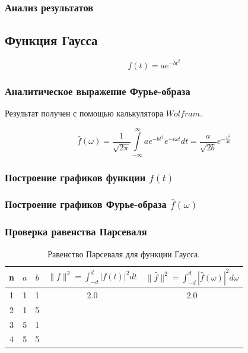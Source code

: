 \documentclass[a5paper, 10pt]{article}
\theoremstyle{definition}
\theoremstyle{plain}
\theoremstyle{remark}
\begin{document}
\subsubsection{Анализ результатов}





\newpage
\subsection{Функция Гаусса}

\begin{equation}
f(t) = a e^{-bt^2}
\end{equation}


\subsubsection{Аналитическое выражение Фурье-образа}

Результат получен с помощью калькулятора $Wolfram$.

\begin{equation}
\hat{f}(\omega) =
 \frac{1}{\sqrt{2 \pi}} \int \limits_{-\infty}^{\infty}  a e^{-bt^2} e^{-i \omega t} dt = \frac{a}{\sqrt{2b}} e^{-\frac{\omega^2}{4b}}
\end{equation}

\subsubsection{Построение графиков функции $f(t)$}





\subsubsection{Построение графиков Фурье-образа $\hat{f} (\omega)$}




\subsubsection{Проверка равенства Парсеваля}

\begin{table}[h!]
\caption{Равенство Парсеваля для функции Гаусса.}
\label{tabular:timesandtenses}
\begin{center}
\begin{tabular}{|c|c|c|c|c|}
\hline
n & $a$ & $b$ & $\| f \|^2 = \int_{-d}^d |f(t)|^2 dt $ & $\| \hat{f} \|^2 = \int_{-d}^d |\hat{f}(\omega)|^2 d\omega $ \\
\hline
1 & 1 & 1 &  2.0& 2.0\\
\hline
2 & 1 & 5 &  & \\
\hline
3 & 5 & 1 &  & \\
\hline
4 & 5 & 5 &  & \\
\hline
\end{tabular}
\end{center}
\end{table}
\end{document}

